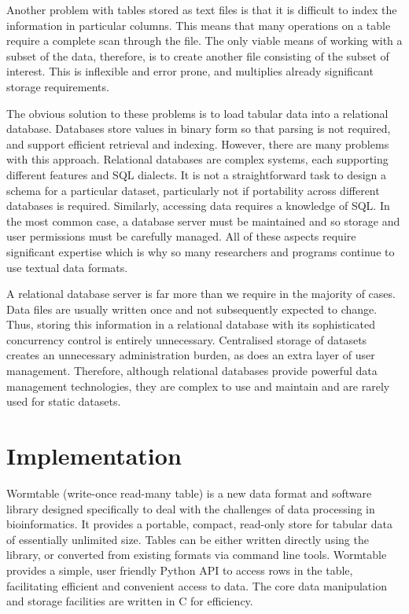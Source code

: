 \documentclass[10pt]{bmc_article}
\newenvironment{bmcformat}{\begin{raggedright}\baselineskip20pt\sloppy\setboolean{publ}{false}}{\end{raggedright}\baselineskip20pt\sloppy}
\begin{document}
\begin{bmcformat}
Another problem with tables stored as text files is that it is difficult 
to index the information in particular columns. 
This means that many operations on a table require a complete scan 
through the file. The only viable means of 
working with a subset of the data, therefore, 
is to create another file consisting of the subset of interest. 
This is inflexible and error prone, and multiplies already significant  
storage requirements.

The obvious solution to these problems is to load tabular data into a
relational database. Databases store values in binary form so that parsing is 
not required, and support efficient retrieval and indexing. However, there 
are many problems with this approach. Relational databases are 
complex systems, each supporting different features and SQL 
dialects. It is not a straightforward task to design a schema for a 
particular dataset, particularly not if portability across different 
databases is required. Similarly, accessing data requires a knowledge
of SQL. In the most common case, a database server must be maintained
and so storage and user permissions must be carefully managed. All of 
these aspects require significant expertise which is why so many researchers 
and programs continue to use textual data formats.

A relational database server is far more than we require in the 
majority of cases. Data files are usually written once and 
not subsequently expected to change.
Thus, storing this information 
in a relational database with its sophisticated concurrency control
is entirely unnecessary. Centralised storage of datasets
creates an unnecessary administration burden, as does an extra
layer of user management. Therefore, although relational databases
provide powerful data management technologies, they are complex
to use and maintain and are rarely used for 
static datasets.

\section*{Implementation}

Wormtable (write-once read-many table) 
is a new data format and software library designed specifically
to deal with the challenges of data processing in bioinformatics.
It provides a portable, compact, read-only store for tabular
data of essentially unlimited size. Tables can
be either written directly using the library, or converted
from existing formats via command line tools. 
Wormtable provides a simple, user friendly Python API to access rows
in the table, facilitating efficient and convenient access to 
data. The core data manipulation and storage facilities 
are written in C for efficiency.


\end{bmcformat}
\end{document}
